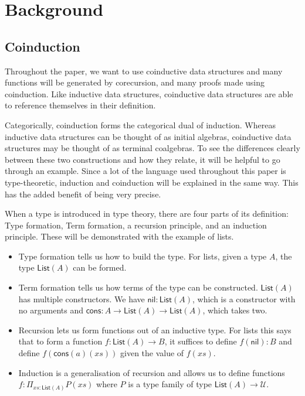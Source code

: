 \documentclass{article}
\theoremstyle{definition}
\theoremstyle{remark}
\begin{document}


\section{Background}\label{sec:background}

\subsection{Coinduction}\label{sec:coinduction}

Throughout the paper, we want to use coinductive data structures and many functions will be generated by corecursion, and many proofs made using coinduction. Like inductive data structures, coinductive data structures are able to reference themselves in their definition.

Categorically, coinduction forms the categorical dual of induction. Whereas inductive data structures can be thought of as initial algebras, coinductive data structures may be thought of as terminal coalgebras. To see the differences clearly between these two constructions and how they relate, it will be helpful to go through an example. Since a lot of the language used throughout this paper is type-theoretic, induction and coinduction will be explained in the same way. This has the added benefit of being very precise.

When a type is introduced in type theory, there are four parts of its definition: Type formation, Term formation, a recursion principle, and an induction principle. These will be demonstrated with the example of lists.
\begin{itemize}
\item Type formation tells us how to build the type. For lists, given a type \(A\), the type \(\mathsf{List}(A)\) can be formed.
\item Term formation tells us how terms of the type can be constructed. \(\mathsf{List}(A)\) has multiple constructors. We have \(\mathsf{nil} : \mathsf{List}(A)\), which is a constructor with no arguments and \(\mathsf{cons} : A \to \mathsf{List}(A) \to \mathsf{List}(A)\), which takes two.
\item Recursion lets us form functions out of an inductive type. For lists this says that to form a function \(f : \mathsf{List}(A) \to B\), it suffices to define \(f(\mathsf{nil}) : B\) and define \(f(\mathsf{cons}(a)(xs))\) given the value of \(f(xs)\).
\item Induction is a generalisation of recursion and allows us to define functions \(f : \Pi_{xs : \mathsf{List}(A)} P(xs)\) where \(P\) is a type family of type \(\mathsf{List}(A) \to \mathcal{U}\).
\end{itemize}
\end{document}
